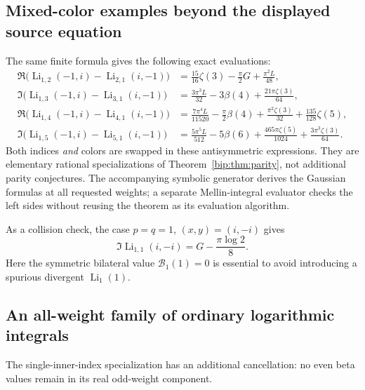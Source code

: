 \documentclass[11pt,a4paper]{article}
\numberwithin{equation}{section}
\theoremstyle{definition}
\theoremstyle{remark}
\DeclareMathOperator{\Li}{Li}
\begin{document}
\subsection{Mixed-color examples beyond the displayed source equation}
The same finite formula gives the following exact evaluations:
\begin{align}
 \Re\bigl(\Li_{1,2}(-1,i)-\Li_{2,1}(i,-1)\bigr)
   &=\frac{15}{16}\zeta(3)-\frac\pi2G+\frac{\pi^2L}{48},
       \label{bip:eq:mix3}\\
 \Im\bigl(\Li_{1,3}(-1,i)-\Li_{3,1}(i,-1)\bigr)
   &=\frac{3\pi^3L}{32}-3\beta(4)+\frac{21\pi\zeta(3)}{64},
       \label{bip:eq:mix4}\\
 \Re\bigl(\Li_{1,4}(-1,i)-\Li_{4,1}(i,-1)\bigr)
   &=\frac{7\pi^4L}{11520}-\frac\pi2\beta(4)
          +\frac{\pi^2\zeta(3)}{32}+\frac{135}{128}\zeta(5),
       \label{bip:eq:mix5}\\
 \Im\bigl(\Li_{1,5}(-1,i)-\Li_{5,1}(i,-1)\bigr)
   &=\frac{5\pi^5L}{512}-5\beta(6)
          +\frac{465\pi\zeta(5)}{1024}
          +\frac{3\pi^3\zeta(3)}{64}.
       \label{bip:eq:mix6}
\end{align}
Both indices \emph{and} colors are swapped in these antisymmetric
expressions. They are elementary rational specializations of
Theorem~\ref{bip:thm:parity}, not additional parity conjectures.
The accompanying symbolic generator derives the Gaussian formulas at
all requested weights; a separate Mellin-integral evaluator checks the
left sides without reusing the theorem as its evaluation algorithm.

As a collision check, the case $p=q=1$, $(x,y)=(i,-i)$ gives
\[
 \Im\Li_{1,1}(i,-i)=G-\frac{\pi\log2}{8}.
\]
Here the symmetric bilateral value $\mathcal B_1(1)=0$ is essential to
avoid introducing a spurious divergent $\Li_1(1)$.


\subsection{An all-weight family of ordinary logarithmic integrals}
The single-inner-index specialization has an additional cancellation:
no even beta values remain in its real odd-weight component.
\end{document}
